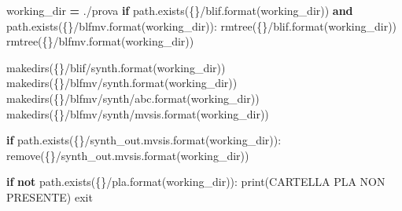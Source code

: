 \documentclass[
  italian,
]{book}
\newenvironment{Shaded}{\begin{snugshade}}{\end{snugshade}}
\newcommand{\BuiltInTok}[1]{#1}
\newcommand{\ControlFlowTok}[1]{\textcolor[rgb]{0.13,0.29,0.53}{\textbf{#1}}}
\newcommand{\KeywordTok}[1]{\textcolor[rgb]{0.13,0.29,0.53}{\textbf{#1}}}
\newcommand{\NormalTok}[1]{#1}
\newcommand{\OperatorTok}[1]{\textcolor[rgb]{0.81,0.36,0.00}{\textbf{#1}}}
\newcommand{\SpecialCharTok}[1]{\textcolor[rgb]{0.00,0.00,0.00}{#1}}
\newcommand{\StringTok}[1]{\textcolor[rgb]{0.31,0.60,0.02}{#1}}
\begin{document}
\begin{Shaded}
\begin{Highlighting}[]
\NormalTok{working\_dir }\OperatorTok{=} \StringTok{\textquotesingle{}./prova\textquotesingle{}}
 \ControlFlowTok{if}\NormalTok{ path.exists(}\StringTok{\textquotesingle{}}\SpecialCharTok{\{\}}\StringTok{/blif\textquotesingle{}}\NormalTok{.}\BuiltInTok{format}\NormalTok{(working\_dir)) }
    \KeywordTok{and}\NormalTok{ path.exists(}\StringTok{\textquotesingle{}}\SpecialCharTok{\{\}}\StringTok{/blfmv\textquotesingle{}}\NormalTok{.}\BuiltInTok{format}\NormalTok{(working\_dir)):}
\NormalTok{        rmtree(}\StringTok{\textquotesingle{}}\SpecialCharTok{\{\}}\StringTok{/blif\textquotesingle{}}\NormalTok{.}\BuiltInTok{format}\NormalTok{(working\_dir))}
\NormalTok{        rmtree(}\StringTok{\textquotesingle{}}\SpecialCharTok{\{\}}\StringTok{/blfmv\textquotesingle{}}\NormalTok{.}\BuiltInTok{format}\NormalTok{(working\_dir))}
      
\NormalTok{makedirs(}\StringTok{\textquotesingle{}}\SpecialCharTok{\{\}}\StringTok{/blif/synth\textquotesingle{}}\NormalTok{.}\BuiltInTok{format}\NormalTok{(working\_dir))}
\NormalTok{makedirs(}\StringTok{\textquotesingle{}}\SpecialCharTok{\{\}}\StringTok{/blfmv/synth\textquotesingle{}}\NormalTok{.}\BuiltInTok{format}\NormalTok{(working\_dir))}
\NormalTok{makedirs(}\StringTok{\textquotesingle{}}\SpecialCharTok{\{\}}\StringTok{/blfmv/synth/abc\textquotesingle{}}\NormalTok{.}\BuiltInTok{format}\NormalTok{(working\_dir))}
\NormalTok{makedirs(}\StringTok{\textquotesingle{}}\SpecialCharTok{\{\}}\StringTok{/blfmv/synth/mvsis\textquotesingle{}}\NormalTok{.}\BuiltInTok{format}\NormalTok{(working\_dir))}

\ControlFlowTok{if}\NormalTok{ path.exists(}\StringTok{\textquotesingle{}}\SpecialCharTok{\{\}}\StringTok{/synth\_out.mvsis\textquotesingle{}}\NormalTok{.}\BuiltInTok{format}\NormalTok{(working\_dir)):}
\NormalTok{    remove(}\StringTok{\textquotesingle{}}\SpecialCharTok{\{\}}\StringTok{/synth\_out.mvsis\textquotesingle{}}\NormalTok{.}\BuiltInTok{format}\NormalTok{(working\_dir))}

\ControlFlowTok{if} \KeywordTok{not}\NormalTok{ path.exists(}\StringTok{\textquotesingle{}}\SpecialCharTok{\{\}}\StringTok{/pla\textquotesingle{}}\NormalTok{.}\BuiltInTok{format}\NormalTok{(working\_dir)):}
    \BuiltInTok{print}\NormalTok{(}\StringTok{\textquotesingle{}CARTELLA PLA NON PRESENTE\textquotesingle{}}\NormalTok{)}
\NormalTok{    exit}
\end{Highlighting}
\end{Shaded}
\end{document}
